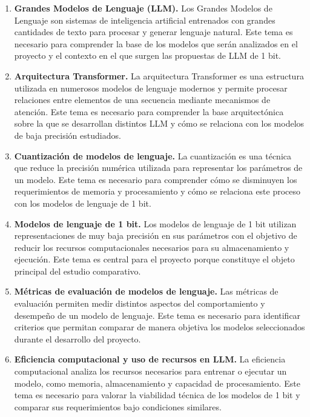 \begin{enumerate}

\item \textbf{Grandes Modelos de Lenguaje (LLM).} Los Grandes Modelos de Lenguaje son sistemas de inteligencia artificial entrenados con grandes cantidades de texto para procesar y generar lenguaje natural. Este tema es necesario para comprender la base de los modelos que serán analizados en el proyecto y el contexto en el que surgen las propuestas de LLM de 1 bit.

\item \textbf{Arquitectura Transformer.} La arquitectura Transformer es una estructura utilizada en numerosos modelos de lenguaje modernos y permite procesar relaciones entre elementos de una secuencia mediante mecanismos de atención. Este tema es necesario para comprender la base arquitectónica sobre la que se desarrollan distintos LLM y cómo se relaciona con los modelos de baja precisión estudiados.

\item \textbf{Cuantización de modelos de lenguaje.} La cuantización es una técnica que reduce la precisión numérica utilizada para representar los parámetros de un modelo. Este tema es necesario para comprender cómo se disminuyen los requerimientos de memoria y procesamiento y cómo se relaciona este proceso con los modelos de lenguaje de 1 bit.

\item \textbf{Modelos de lenguaje de 1 bit.} Los modelos de lenguaje de 1 bit utilizan representaciones de muy baja precisión en sus parámetros con el objetivo de reducir los recursos computacionales necesarios para su almacenamiento y ejecución. Este tema es central para el proyecto porque constituye el objeto principal del estudio comparativo.

\item \textbf{Métricas de evaluación de modelos de lenguaje.} Las métricas de evaluación permiten medir distintos aspectos del comportamiento y desempeño de un modelo de lenguaje. Este tema es necesario para identificar criterios que permitan comparar de manera objetiva los modelos seleccionados durante el desarrollo del proyecto.

\item \textbf{Eficiencia computacional y uso de recursos en LLM.} La eficiencia computacional analiza los recursos necesarios para entrenar o ejecutar un modelo, como memoria, almacenamiento y capacidad de procesamiento. Este tema es necesario para valorar la viabilidad técnica de los modelos de 1 bit y comparar sus requerimientos bajo condiciones similares.

\end{enumerate}
